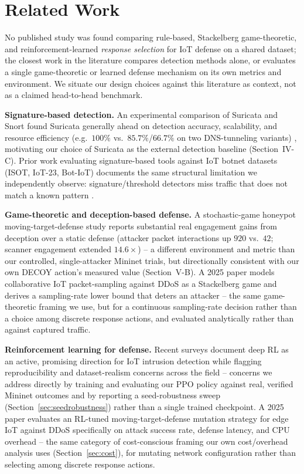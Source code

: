 \documentclass[conference]{IEEEtran}
\begin{document}
\section{Related Work}

No published study was found comparing rule-based, Stackelberg game-theoretic, and
reinforcement-learned \emph{response selection} for IoT defense on a shared dataset; the closest
work in the literature compares detection methods alone, or evaluates a single game-theoretic or
learned defense mechanism on its own metrics and environment. We situate our design choices
against this literature as context, not as a claimed head-to-head benchmark.

\textbf{Signature-based detection.} An experimental comparison of Suricata and Snort found
Suricata generally ahead on detection accuracy, scalability, and resource efficiency (e.g.\ $100\%$
vs.\ $85.7\%$/$66.7\%$ on two DNS-tunneling variants) \cite{nps_suricata_snort}, motivating our
choice of Suricata as the external detection baseline (Section~IV-C). Prior work evaluating
signature-based tools against IoT botnet datasets (ISOT, IoT-23, Bot-IoT) documents the same
structural limitation we independently observe: signature/threshold detectors miss traffic that
does not match a known pattern \cite{iot_botnet_detection}.

\textbf{Game-theoretic and deception-based defense.} A stochastic-game honeypot moving-target-defense
study reports substantial real engagement gains from deception over a static defense (attacker
packet interactions up $920$ vs.\ $42$; scanner engagement extended $14.6\times$)
\cite{mtd_honeypot_stochastic_game} -- a different environment and metric than our controlled,
single-attacker Mininet trials, but directionally consistent with our own DECOY action's measured
value (Section~V-B). A 2025 paper models collaborative IoT packet-sampling against DDoS as a
Stackelberg game and derives a sampling-rate lower bound that deters an attacker
\cite{stackelberg_iot_ddos_sampling} -- the same game-theoretic framing we use, but for a
continuous sampling-rate decision rather than a choice among discrete response actions, and
evaluated analytically rather than against captured traffic.

\textbf{Reinforcement learning for defense.} Recent surveys document deep RL as an active,
promising direction for IoT intrusion detection while flagging reproducibility and dataset-realism
concerns across the field \cite{drl_iot_survey} -- concerns we address directly by training and
evaluating our PPO policy against real, verified Mininet outcomes and by reporting a
seed-robustness sweep (Section~\ref{sec:seedrobustness}) rather than a single trained checkpoint. A
2025 paper evaluates an RL-tuned moving-target-defense mutation strategy for edge IoT against DDoS
specifically on attack success rate, defense latency, and CPU overhead \cite{rl_mtd_edge_iot} --
the same category of cost-conscious framing our own cost/overhead analysis uses
(Section~\ref{sec:cost}), for mutating network
configuration rather than selecting among discrete response actions.
\end{document}

